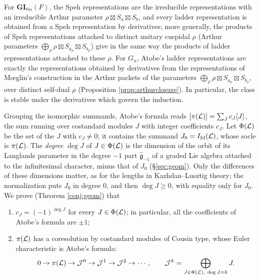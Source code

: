 \documentclass[a4paper,12pt,leqno]{amsart}
\theoremstyle{plain}
\theoremstyle{definition}
\begin{document}
 For $\mathbf{GL}_m(F)$, the Speh
representations are the irreducible representations with an irreducible Arthur parameter
$\rho\boxtimes S_a\boxtimes S_b$, and every ladder representation is obtained from a Speh representation
by derivatives; more generally, the products of Speh representations attached to distinct unitary
cuspidal $\rho$ (Arthur parameters $\bigoplus_\rho\rho\boxtimes S_{a_\rho}\boxtimes S_{b_\rho}$) give in the
same way the products of ladder representations attached to these $\rho$. For $G_n$, Atobe's ladder
representations are exactly the representations obtained by derivatives from the representations of
M\oe glin's construction in the Arthur packets of the parameters
$\bigoplus_\rho\rho\boxtimes S_{a_\rho}\boxtimes S_{b_\rho}$, over distinct self-dual $\rho$ (Proposition
\ref{prop:arthurclosure}). In particular, the class is stable under the derivatives which govern the
induction.

Grouping the isomorphic summands, Atobe's formula reads $[\pi(\mathcal{L})]=\sum_Jc_J[J]$, the sum running over
costandard modules $J$ with integer coefficients $c_J$. Let $\Phi(\mathcal{L})$ be the set of the $J$ with
$c_J\neq0$; it contains the summand $J_0=I_{\mathrm{Id}}(\mathcal{L})$, whose socle is $\pi(\mathcal{L})$. The \emph{degree}
$\deg J$ of $J\in\Phi(\mathcal{L})$ is the dimension of the orbit of its Langlands parameter in the degree $-1$
part $\widehat{\mathfrak g}_{-1}$ of a graded Lie algebra attached to the infinitesimal character, minus
that of $J_0$ (\S\ref{sec:geom}). Only the differences of these dimensions matter, as for the lengths
in Kazhdan--Lusztig theory; the normalization puts $J_0$ in degree $0$, and then $\deg J\geq0$, with
equality only for $J_0$. We prove (Theorem
\ref{conj:geom}) that
\begin{enumerate}
\item $c_J=(-1)^{\deg J}$ for every $J\in\Phi(\mathcal{L})$; in particular, all the coefficients of Atobe's
formula are $\pm1$;
\item $\pi(\mathcal{L})$ has a coresolution by costandard modules of Cousin type, whose Euler characteristic is
Atobe's formula:
\[0\to\pi(\mathcal{L})\to\mathcal{J}^0\to\mathcal{J}^1\to\mathcal{J}^2\to\cdots,\qquad \mathcal{J}^k=\bigoplus_{J\in\Phi(\mathcal{L}),\ \deg J=k}J.\]
\end{enumerate}
\end{document}
